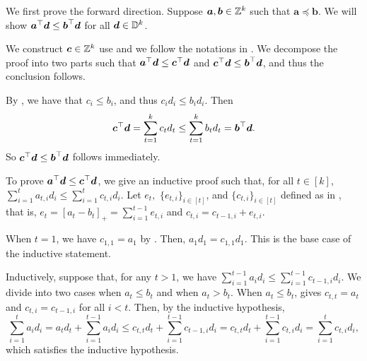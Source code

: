\documentclass[runningheads]{llncs}
\begin{document}
\begin{proofof}{}
\thisway We first prove the forward direction. 
Suppose $\boldsymbol a, \boldsymbol b\in\mathbb Z^k$ such that $\bm a\preceq\bm b$. 
We will show $\boldsymbol a^\top\boldsymbol d\leq \boldsymbol b^\top\boldsymbol d$ for all $\boldsymbol d\in\mathbb D^k$.

We construct $\boldsymbol c\in\mathbb Z^k$ use  and we follow the notations in . 
We decompose the proof into two parts such that $\boldsymbol a^\top\boldsymbol d\leq\boldsymbol c^\top\boldsymbol d$ and $\boldsymbol c^\top\boldsymbol d\leq\boldsymbol b^\top\boldsymbol d$, and thus the conclusion follows.

By , we have that $c_i\leq b_i$, and thus $c_id_i\leq b_i d_i$. Then 
$$\boldsymbol c^\top\boldsymbol d = \sum_{t=1}^{k}c_td_t\leq \sum_{t=1}^{k}b_td_t = \boldsymbol b^\top\boldsymbol d.$$
So $\boldsymbol c^\top\boldsymbol d \leq  \boldsymbol b^\top\boldsymbol d$ follows immediately.

To prove $\boldsymbol a^\top\boldsymbol d\leq \boldsymbol c^\top\boldsymbol d$, we give an inductive proof such that, for all $t\in[k]$, $\sum_{i=1}^t a_{t,i}d_i \leq \sum_{i=1}^tc_{t,i}d_i$.
Let $e_t,$ $\{e_{t,i}\}_{i\in[t]}$, and $\{c_{t,i}\}_{i\in[t]}$ defined as in , that is, $e_t = [a_t - b_t]_+= \sum_{i=1}^{t-1} e_{t,i}$ and $c_{t,i} = c_{t-1, i} + e_{t, i}$. 

When $t=1$, we have $c_{1,1} = a_1$ by . Then, $ a_1d_1  = c_{1,1}d_1 $. This is the base case of the inductive statement. 

Inductively, suppose that, for any $t>1$, we have $\sum_{i=1}^{t-1} a_i d_i\leq \sum_{i=1}^{t-1} c_{t-1,i} d_i$. 
We divide into two cases when $a_t\leq b_t$ and when $a_t>b_t.$
When $a_t\leq b_t$,  gives $c_{t,t} = a_t$ and $c_{t,i} = c_{t-1,i}$ for all $i<t$. 
Then, by the inductive hypothesis, $$\sum_{i=1}^{t} a_i d_i = a_td_t + \sum_{i=1}^{t-1} a_i d_i \leq c_{t,t} d_t +  \sum_{i=1}^{t-1} c_{t-1,i} d_i = c_{t,t} d_t +  \sum_{i=1}^{t-1} c_{t,i} d_i =\sum_{i=1}^{t} c_{t,i} d_i,$$ which satisfies the inductive hypothesis. 


\end{proofof}
\end{document}
